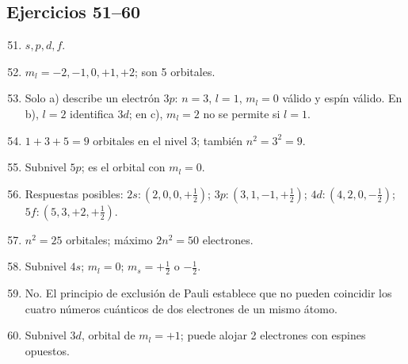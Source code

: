 \documentclass[12pt, letterpaper]{article}
\begin{document}
\subsection*{Ejercicios 51--60}
\begin{enumerate}[leftmargin=*, label=\textbf{\arabic*.}]
  \setcounter{enumi}{50}
  \item $s,p,d,f$.
  \item $m_l=-2,-1,0,+1,+2$; son 5 orbitales.
  \item Solo a) describe un electrón $3p$: $n=3$, $l=1$, $m_l=0$ válido y espín válido. En b), $l=2$ identifica $3d$; en c), $m_l=2$ no se permite si $l=1$.
  \item $1+3+5=9$ orbitales en el nivel 3; también $n^2=3^2=9$.
  \item Subnivel $5p$; es el orbital con $m_l=0$.
  \item Respuestas posibles: $2s:(2,0,0,+\tfrac12)$; $3p:(3,1,-1,+\tfrac12)$; $4d:(4,2,0,-\tfrac12)$; $5f:(5,3,+2,+\tfrac12)$.
  \item $n^2=25$ orbitales; máximo $2n^2=50$ electrones.
  \item Subnivel $4s$; $m_l=0$; $m_s=+\tfrac12$ o $-\tfrac12$.
  \item No. El principio de exclusión de Pauli establece que no pueden coincidir los cuatro números cuánticos de dos electrones de un mismo átomo.
  \item Subnivel $3d$, orbital de $m_l=+1$; puede alojar 2 electrones con espines opuestos.
\end{enumerate}
\fi
\end{document}
